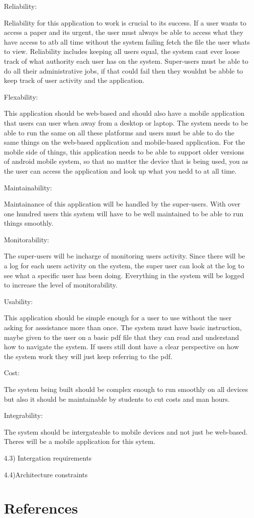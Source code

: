 \documentclass[a4paper,12pt]{report}
\begin{document}
Reliability:

Reliability for this application to work is crucial to its success. If a user wants to access a paper and its urgent, the user must always be able to access what they have access to atb all time without the system failing fetch the file the user whats to view. Reliability includes keeping all users equal, the system cant ever loose track of what authority each user has on the system. Super-users must be able to do all their administrative jobs, if that could fail then they wouldnt be abble to keep track of user activity and the application. 

Flexability:

This application should be web-based and should also have a mobile application that users can user when away from a desktop or laptop. The system needs to be able to run the same on all these platforms and users must be able to do the same things on the web-based application and mobile-based application. For the mobile side of things, this application needs to be able to support older versions of android mobile system, so that no matter the device that is being used, you as the user can access the application and look up what you nedd to at all time.

Maintainability:

Maintainance of this application will be handled by the super-users. With over one hundred users this system will have to be well maintained to be able to run things smoothly.

Monitorability:

The super-users will be incharge of monitoring users activity. Since there will be a log for each users activity on the system, the super user can look at the log to see what a specific user has been doing. Everything in the system will be logged to increase the level of monitorability.

Usability:
 
This application should be simple enough for a user to use without the user asking for asssistance more than once. The system must have basic instruction, maybe given to the user on a basic pdf file that they can read and understand how to navigate the system. If users still dont have a clear perspective on how the system work they will just keep referring to the pdf.

Cost:

The system being built should be complex enough to run smoothly on all devices but also it should be maintainable by students to cut costs and man hours.

Integrability:

The system should be intergateable to mobile devices and not just be web-based. Theres will be a mobile application for this sytem.


4.3) Intergation requirements





4.4)Architecture constraints

\section{References} 
\end{document}
